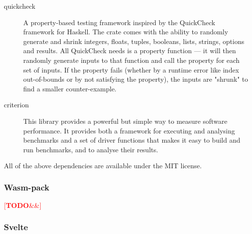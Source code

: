 \documentclass[english,engineering]{wizthesis}
\newcommand{\todo}[1]{%
  \textcolor{red}{[\textbf{TODO}\ifx&#1&{}\else{ }\fi\emph{#1}]}%
}
\begin{document}
\begin{description}
  \item[quickcheck] A property-based testing framework inspired by the
  QuickCheck framework for Haskell. The crate comes with the ability to randomly
  generate and shrink integers, floats, tuples, booleans, lists, strings,
  options and results. All QuickCheck needs is a property function --- it will
  then randomly generate inputs to that function and call the property for each
  set of inputs. If the property fails (whether by a runtime error like index
  out-of-bounds or by not satisfying the property), the inputs are "shrunk" to
  find a smaller counter-example.
  \item[criterion] This library provides a powerful but simple way to measure
  software performance. It provides both a framework for executing and analysing
  benchmarks and a set of driver functions that makes it easy to build and run
  benchmarks, and to analyse their results.
\end{description}
All of the above dependencies are available under the MIT license.

\subsubsection*{Wasm-pack}

\todo{}

\subsubsection*{Svelte}
\end{document}
